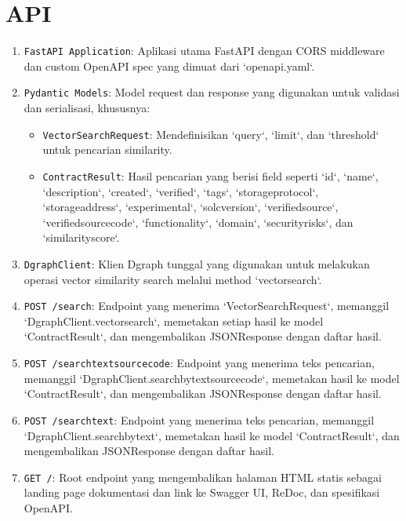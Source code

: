 \chapter{API}
\label{appendix:api}

\begin{enumerate}
	\item \texttt{FastAPI Application}: Aplikasi utama FastAPI dengan CORS middleware dan custom OpenAPI spec yang dimuat dari `openapi.yaml`.
	\item \texttt{Pydantic Models}: Model request dan response yang digunakan untuk validasi dan serialisasi, khususnya:
	      \begin{itemize}
		      \item \texttt{VectorSearchRequest}: Mendefinisikan `query`, `limit`, dan `threshold` untuk pencarian similarity.
		      \item \texttt{ContractResult}: Hasil pencarian yang berisi field seperti `id`, `name`, `description`, `created`, `verified`, `tags`, `storage\textunderscore protocol`, `storage\textunderscore address`, `experimental`, `solc\textunderscore version`, `verified\textunderscore source`, `verified\textunderscore source\textunderscore code`, `functionality`, `domain`, `security\textunderscore risks`, dan `similarity\textunderscore score`.
	      \end{itemize}
	\item \texttt{DgraphClient}: Klien Dgraph tunggal yang digunakan untuk melakukan operasi vector similarity search melalui method `vector\textunderscore search`.
	\item \texttt{POST /search}: Endpoint yang menerima `VectorSearchRequest`, memanggil `DgraphClient.vector\textunderscore search`, memetakan setiap hasil ke model `ContractResult`, dan mengembalikan JSONResponse dengan daftar hasil.
	\item \texttt{POST /search\textunderscore text\textunderscore source\textunderscore code}: Endpoint yang menerima teks pencarian, memanggil `DgraphClient.search\textunderscore by\textunderscore text\textunderscore source\textunderscore code`, memetakan hasil ke model `ContractResult`, dan mengembalikan JSONResponse dengan daftar hasil.
	\item \texttt{POST /search\textunderscore text}: Endpoint yang menerima teks pencarian, memanggil `DgraphClient.search\textunderscore by\textunderscore text`, memetakan hasil ke model `ContractResult`, dan mengembalikan JSONResponse dengan daftar hasil.
	\item \texttt{GET /}: Root endpoint yang mengembalikan halaman HTML statis sebagai landing page dokumentasi dan link ke Swagger UI, ReDoc, dan spesifikasi OpenAPI.
\end{enumerate}

